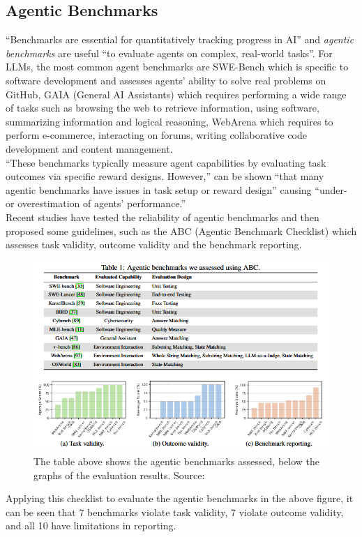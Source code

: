 \documentclass[12pt]{article}
\begin{document}
	\subsection{Agentic Benchmarks}
	``Benchmarks are essential for quantitatively tracking progress in AI'' and \textit{agentic benchmarks} are useful ``to evaluate agents on complex, real-world tasks''\cite{zhu2025establishingbestpracticesbuilding}. For LLMs, the most common agent benchmarks are SWE-Bench which is specific to software development and assesses agents' ability to solve real problems on GitHub, GAIA (General AI Assistants) which requires performing a wide range of tasks such as browsing the web to retrieve information, using software, summarizing information and logical reasoning, WebArena which requires to perform e-commerce, interacting on forums, writing collaborative code development and content management.\\
	``These benchmarks typically measure agent capabilities by evaluating task outcomes via specific reward
designs. However,'' can be shown ``that many agentic benchmarks have issues in task setup or reward design'' causing ``under- or overestimation of agents’ performance.''\cite{zhu2025establishingbestpracticesbuilding}\\
Recent studies have tested the reliability of agentic benchmarks and then proposed some guidelines, such as the ABC (Agentic Benchmark Checklist) which assesses task validity, outcome validity and the benchmark reporting.\\
\begin{figure}[H]
    \centering
            \includegraphics[width=1\textwidth]{AgenticBenchmarksAssessment.png}
    \caption[Assessing of agentic benchmarks]{The table above shows the agentic benchmarks assessed, below the graphs of the evaluation results. Source: \cite{zhu2025establishingbestpracticesbuilding}}
    \end{figure}
Applying this checklist to evaluate the agentic benchmarks in the above figure, it can be seen that 7 benchmarks violate task validity, 7 violate outcome validity, and all 10 have limitations in reporting.\cite{zhu2025establishingbestpracticesbuilding}\\
\end{document}
